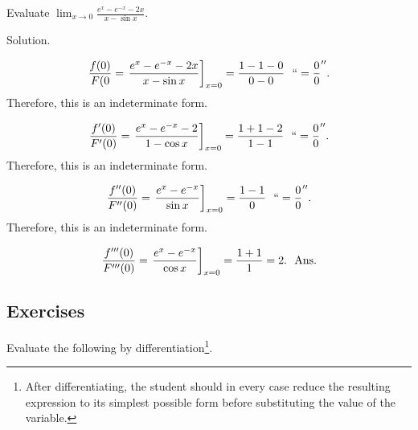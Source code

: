 \begin{example}
Evaluate $\lim_{x \to 0} \frac{e^x - e^{-x} - 2x}{x - \sin x}$.

Solution. 

\[
\frac{f(0)}{F(0} = \left. \frac{e^x - e^{-x} - 2x}{x - \sin x} \right]_{x = 0} 
= \frac{1 - 1 - 0}{0 - 0}\ \ `` = \frac{0}{0}''.
\]
Therefore, this is an indeterminate form.

\[
\frac{f'(0)}{F'(0)} = \left. \frac{e^x - e^{-x} - 2}{1 - \cos x} \right]_{x = 0} 
= \frac{1 + 1 - 2}{1 - 1}\ \ `` = \frac{0}{0}''.
\]
Therefore, this is an indeterminate form.

\[
\frac{f''(0)}{F''(0)} = \left. \frac{e^x - e^{-x}}{\sin x} \right]_{x = 0} 
= \frac{1 - 1}{0}\ \ `` = \frac{0}{0}''.
\]
Therefore, this is an indeterminate form.

\[
\frac{f'''(0)}{F'''(0)} = \left. \frac{e^x - e^{-x}}{\cos x} \right]_{x = 0} 
= \frac{1 + 1}{1} = 2. \ \ {\rm Ans.}
\]
\end{example}

\subsection{Exercises}

Evaluate the following by differentiation\footnote{After differentiating, 
the student should in every case reduce the resulting expression to its 
simplest possible form before substituting the value of the variable.}.

